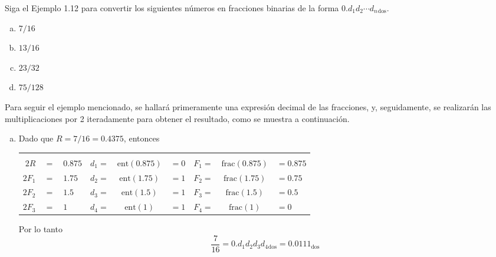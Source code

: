 \begin{enunciado}
 Siga el Ejemplo 1.12 para convertir los siguientes n\'umeros en fracciones binarias de la forma $0.d_1d_2\cdots d_n{}_{\text{dos}}$.
 \begin{multicols}{4}
  \begin{enumerate}[(a)]
   \item $7/16$
   \item $13/16$
   \item $23/32$
   \item $75/128$
  \end{enumerate}
 \end{multicols}
\end{enunciado}

\begin{solucion}
 Para seguir el ejemplo mencionado, se hallar\'a primeramente una expresi\'on decimal de las fracciones, y, seguidamente, se realizar\'an las multiplicaciones por 2 iteradamente para obtener el resultado, como se muestra a continuaci\'on.
 \begin{enumerate}[(a)]
  \item Dado que $R = 7/16 = 0.4375$, entonces
  \begin{center}
   \begin{tabular}{rclrclrcl}
    & & & \hspace{1.5cm} & & \hspace{1.5cm} \\
    $2R$ & $=$ & $0.875$ & $d_1 =$ & $\text{ent}(0.875)$ & $=0$ & $F_1 =$ & $\text{frac}(0.875)$ & $=0.875$ \\
    $2F_1$ & $=$ & $1.75$ & $d_2 =$ & $\text{ent}(1.75)$ & $=1$ & $F_2 =$ & $\text{frac}(1.75)$ & $=0.75$ \\
    $2F_2$ & $=$ & $1.5$ & $d_3 =$ & $\text{ent}(1.5)$ & $=1$ & $F_3 =$ & $\text{frac}(1.5)$ & $=0.5$ \\
    $2F_3$ & $=$ & $1$ & $d_4 =$ & $\text{ent}(1)$ & $=1$ & $F_4 =$ & $\text{frac}(1)$ & $=0$ \\
   \end{tabular}
  \end{center}
  Por lo tanto
  \begin{equation*}
   \frac{7}{16} = 0.d_1d_2d_3d_4{}_{\text{dos}} = 0.0111_{\text{dos}}
  \end{equation*}


\end{enumerate}
\end{solucion}
